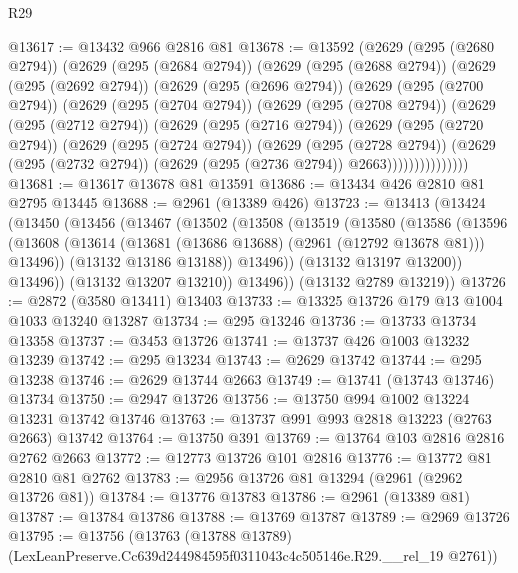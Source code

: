 \begin{lexlean}{R29}
\begin{coremodule}
@13617 := @13432 @966 @2816 @81
@13678 := @13592
    (@2629
      (@295 (@2680 @2794))
      (@2629
        (@295 (@2684 @2794))
        (@2629
          (@295 (@2688 @2794))
          (@2629
            (@295 (@2692 @2794))
            (@2629
              (@295 (@2696 @2794))
              (@2629
                (@295 (@2700 @2794))
                (@2629
                  (@295 (@2704 @2794))
                  (@2629
                    (@295 (@2708 @2794))
                    (@2629
                      (@295 (@2712 @2794))
                      (@2629
                        (@295 (@2716 @2794))
                        (@2629
                          (@295 (@2720 @2794))
                          (@2629
                            (@295 (@2724 @2794))
                            (@2629
                              (@295 (@2728 @2794))
                              (@2629
                                (@295 (@2732 @2794))
                                (@2629 (@295 (@2736 @2794)) @2663)))))))))))))))
@13681 := @13617 @13678 @81 @13591
@13686 := @13434 @426 @2810 @81 @2795 @13445
@13688 := @2961 (@13389 @426)
@13723 := @13413
    (@13424
      (@13450
        (@13456
          (@13467
            (@13502
              (@13508
                (@13519
                  (@13580
                    (@13586
                      (@13596
                        (@13608
                          (@13614 (@13681 (@13686 @13688) (@2961 (@12792 @13678 @81))) @13496))
                        (@13132 @13186 @13188))
                      @13496))
                  (@13132 @13197 @13200))
                @13496))
            (@13132 @13207 @13210))
          @13496))
      (@13132 @2789 @13219))
@13726 := @2872 (@3580 @13411) @13403
@13733 := @13325 @13726 @179 @13 @1004 @1033 @13240 @13287
@13734 := @295 @13246
@13736 := @13733 @13734 @13358
@13737 := @3453 @13726
@13741 := @13737 @426 @1003 @13232 @13239
@13742 := @295 @13234
@13743 := @2629 @13742
@13744 := @295 @13238
@13746 := @2629 @13744 @2663
@13749 := @13741 (@13743 @13746) @13734
@13750 := @2947 @13726
@13756 := @13750 @994 @1002 @13224 @13231 @13742 @13746
@13763 := @13737 @991 @993 @2818 @13223 (@2763 @2663) @13742
@13764 := @13750 @391
@13769 := @13764 @103 @2816 @2816 @2762 @2663
@13772 := @12773 @13726 @101 @2816
@13776 := @13772 @81 @2810 @81 @2762
@13783 := @2956 @13726 @81 @13294 (@2961 (@2962 @13726 @81))
@13784 := @13776 @13783
@13786 := @2961 (@13389 @81)
@13787 := @13784 @13786
@13788 := @13769 @13787
@13789 := @2969 @13726
@13795 := @13756
    (@13763 (@13788 @13789) (LexLeanPreserve.Cc639d244984595f0311043c4c505146e.R29.__rel_19 @2761))

\end{coremodule}
\end{lexlean}
